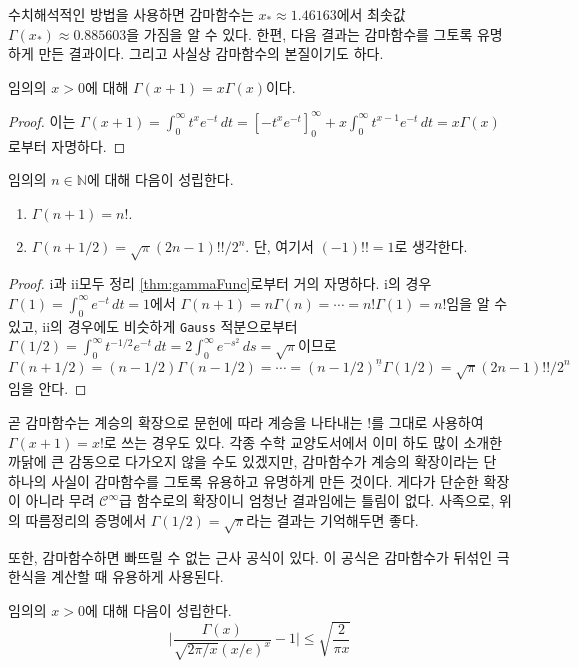 수치해석적인 방법을 사용하면 감마함수는 $x_*\approx1.46163$에서 최솟값 $\Gamma(x_*)\approx0.885603$을 가짐을 알 수 있다. 한편, 다음 결과는 감마함수를 그토록 유명하게 만든 결과이다. 그리고 사실상 감마함수의 본질이기도 하다.

\begin{theorem}\label{thm:gammaFunc}
    임의의 $x>0$에 대해 $\Gamma(x+1)=x\Gamma(x)$이다.
\end{theorem}

\begin{proof}
    이는 $\Gamma(x+1)=\int_0^\infty t^xe^{-t}\,dt=[-t^xe^{-t}]_0^\infty+x\int_0^\infty t^{x-1}e^{-t}\,dt=x\Gamma(x)$로부터 자명하다.
\end{proof}

\begin{corollary}
    임의의 $n\in\mathbb{N}$에 대해 다음이 성립한다.
    \begin{enumerate}
        \item $\Gamma(n+1)=n!$.
        \item $\Gamma(n+1/2)=\sqrt{\pi}(2n-1)!!/2^n$. 단, 여기서 $(-1)!!=1$로 생각한다.
    \end{enumerate}
\end{corollary}

\begin{proof}
    i과 ii모두 정리 \ref{thm:gammaFunc}로부터 거의 자명하다. i의 경우 $\Gamma(1)=\int_0^\infty e^{-t}\,dt=1$에서 $\Gamma(n+1)=n\Gamma(n)=\cdots=n!\Gamma(1)=n!$임을 알 수 있고, ii의 경우에도 비슷하게 \texttt{Gauss} 적분으로부터 $\Gamma(1/2)=\int_0^\infty t^{-1/2}e^{-t}\,dt=2\int_0^\infty e^{-s^2}\,ds=\sqrt{\pi}$이므로 $\Gamma(n+1/2)=(n-1/2)\Gamma(n-1/2)=\cdots=(n-1/2)^{\underline{n}}\Gamma(1/2)=\sqrt{\pi}(2n-1)!!/2^n$임을 안다.
\end{proof}

곧 감마함수는 계승의 확장으로 문헌에 따라 계승을 나타내는 $!$를 그대로 사용하여 $\Gamma(x+1)=x!$로 쓰는 경우도 있다. 각종 수학 교양도서에서 이미 하도 많이 소개한 까닭에 큰 감동으로 다가오지 않을 수도 있겠지만, 감마함수가 계승의 확장이라는 단 하나의 사실이 감마함수를 그토록 유용하고 유명하게 만든 것이다. 게다가 단순한 확장이 아니라 무려 $\mathcal{C}^\infty$급 함수로의 확장이니 엄청난 결과임에는 틀림이 없다. 사족으로, 위의 따름정리의 증명에서 $\Gamma(1/2)=\sqrt{\pi}$라는 결과는 기억해두면 좋다.

또한, 감마함수하면 빠뜨릴 수 없는 근사 공식이 있다. 이 공식은 감마함수가 뒤섞인 극한식을 계산할 때 유용하게 사용된다.

\begin{theorem}
    임의의 $x>0$에 대해 다음이 성립한다.
    \begin{equation*}
        \bigg|\frac{\Gamma(x)}{\sqrt{2\pi/x}(x/e)^x}-1\bigg|\leq\sqrt{\frac{2}{\pi x}}
    \end{equation*}
\end{theorem}

